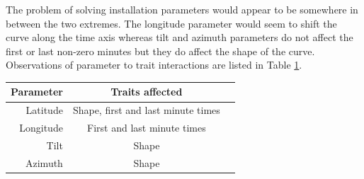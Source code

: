 \newpage The problem of solving installation parameters would appear to be somewhere in between the two extremes. The longitude parameter would seem to shift the curve along the time axis whereas tilt and azimuth parameters do not affect the first or last non-zero minutes but they do affect the shape of the curve. Observations of parameter to trait interactions are listed in Table \ref{table_traits}.



\begin{table}[H]
\centering
\begin{tabular}{r|cc} \hline\hline

 Parameter & Traits affected\\ \hline
 Latitude & Shape, first and last minute times\\
 Longitude & First and last minute times\\
 Tilt & Shape\\
 Azimuth & Shape\\

\hline\hline
\end{tabular}
\label{table_traits}
\end{table}









